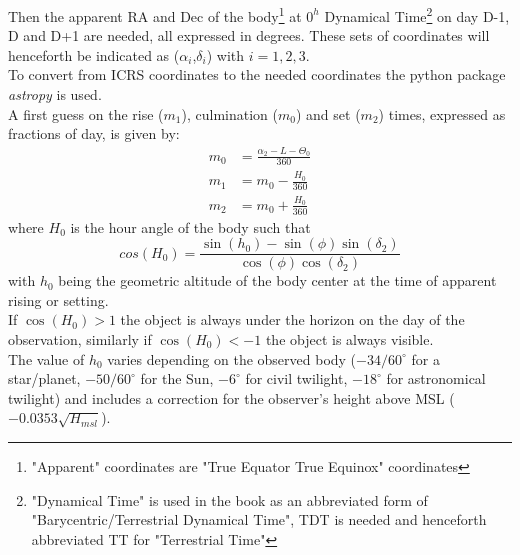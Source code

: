 \documentclass[a4paper]{article}
\begin{document}
\begin{multicols}{2}
		Then the apparent RA and Dec of the body\footnote{"Apparent" coordinates are "True Equator True Equinox" coordinates} at $0^h$ Dynamical Time\footnote{"Dynamical Time" is used in the book as an abbreviated form of "Barycentric/Terrestrial Dynamical Time", TDT is needed and henceforth abbreviated TT for "Terrestrial Time"} on day D-1, D and D+1 are needed, all expressed in degrees. These sets of coordinates will henceforth be indicated as ($\alpha_i$,$\delta_i$) with $i = 1,2,3$.\\
		To convert from ICRS coordinates to the needed coordinates the python package \textit{astropy} is used.\\
		
		A first guess on the rise ($m_1$), culmination ($m_0$) and set ($m_2$) times, expressed as fractions of day, is given by:
		\begin{align}
			m_0 &= \frac{\alpha_2 - L - \Theta_0}{360}\\
			m_1 &= m_0 - \frac{H_0}{360}\\
			m_2 &= m_0 + \frac{H_0}{360}
		\end{align}
		where $H_0$ is the hour angle of the body such that
		\begin{equation*}
			cos(H_0) = \frac{\sin(h_0)-\sin(\phi)\sin(\delta_2)}{\cos(\phi)\cos(\delta_2)}
		\end{equation*}
		with $h_0$ being the geometric altitude of the body center at the time of apparent rising or setting.\\
		If $\cos(H_0) > 1$ the object is always under the horizon on the day of the observation, similarly if $\cos(H_0) < -1$ the object is always visible.\\
		The value of $h_0$ varies depending on the observed body ($-34/60^{\circ}$ for a star/planet, $-50/60^{\circ}$ for the Sun, $-6^{\circ}$ for civil twilight, $-18^{\circ}$ for astronomical twilight) and includes a correction for the observer's height above MSL ($-0.0353\sqrt{H_{msl}}$).\\
		

\end{multicols}
\end{document}
